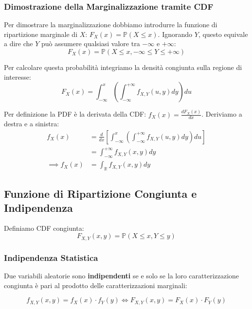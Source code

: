 \subsubsection*{Dimostrazione della Marginalizzazione tramite CDF}

Per dimostrare la marginalizzazione dobbiamo introdurre la funzione di ripartizione marginale di $X$: $F_X(x) = \mathbb{P}(X \le x)$.
Ignorando $Y$, questo equivale a dire che $Y$ può assumere qualsiasi valore tra $-\infty$ e $+\infty$:
\begin{equation}
F_X(x) = \mathbb{P}(X \le x, -\infty \le Y \le +\infty)
\end{equation}

Per calcolare questa probabilità integriamo la densità congiunta sulla regione di interesse:
\begin{equation}
F_X(x) = \int_{-\infty}^{x} \left( \int_{-\infty}^{+\infty} f_{X,Y}(u,y) dy \right) du
\end{equation}

Per definizione la PDF è la derivata della CDF: $f_X(x) = \frac{d F_X(x)}{dx}$. Deriviamo a destra e a sinistra:
\begin{align}
f_X(x) &= \frac{d}{dx} \left[ \int_{-\infty}^{x} \left( \int_{-\infty}^{+\infty} f_{X,Y}(u,y) dy \right) du \right] \nonumber \\
&= \int_{-\infty}^{+\infty} f_{X,Y}(x,y) dy \nonumber \\
\implies f_X(x) &= \int_{\mathbb{R}} f_{X,Y}(x,y) dy
\end{align}

\subsection{Funzione di Ripartizione Congiunta e Indipendenza}

Definiamo CDF congiunta:
\begin{equation}
F_{X,Y}(x,y) = \mathbb{P}(X \le x, Y \le y)
\end{equation}

\subsubsection*{Indipendenza Statistica}
Due variabili aleatorie sono \textbf{indipendenti} se e solo se la loro caratterizzazione congiunta è pari al prodotto delle caratterizzazioni marginali:

\begin{equation}
f_{X,Y}(x,y) = f_X(x) \cdot f_Y(y) \iff F_{X,Y}(x,y) = F_X(x) \cdot F_Y(y)
\end{equation}

